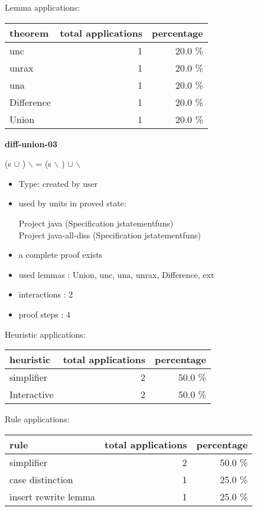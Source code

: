 \documentclass[a4paper]{article}
\begin{document}
Lemma applications:

\begin{supertabular}{l|r|r}
theorem	        & total applications & percentage \\ \hline
unc & 1 & 20.0 \% \\
unrax & 1 & 20.0 \% \\
una & 1 & 20.0 \% \\
Difference & 1 & 20.0 \% \\
Union & 1 & 20.0 \% \\

\end{supertabular}
\pagebreak

{\LARGE\bf diff-union-03}\label{lemma-diff-union-03}

\medskip

 \Fol (s $\cup$ ) $\backslash$  = (s $\backslash$ ) $\cup$  $\backslash$ 

\begin{itemize}

\item Type: created by user

\item used by units in proved state:

Project java (Specification jstatementfuns) \\
Project java-all-diss (Specification jstatementfuns)
\item       a complete proof exists
\item       used lemmas  : Union, unc, una, unrax, Difference, ext
\item       interactions : 2
\item       proof steps  : 4
\end{itemize}

\medskip


Heuristic applications:

\begin{supertabular}{l|r|r}
heuristic	& total applications & percentage \\ \hline
simplifier & 2 & 50.0 \% \\
Interactive & 2 & 50.0 \% \\

\end{supertabular}

Rule applications:

\begin{supertabular}{l|r|r}
rule	        & total applications & percentage \\ \hline
simplifier & 2 & 50.0 \% \\
case distinction & 1 & 25.0 \% \\
insert rewrite lemma & 1 & 25.0 \% \\

\end{supertabular}
\end{document}
